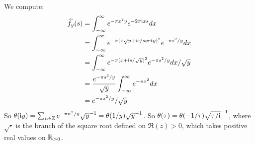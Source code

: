 \documentclass[10pt,a4paper]{article}
\begin{document}
We compute:
\begin{align*}
  \widehat{f_y}(s) &=\int_{-\infty}^{\infty} e^{-\pi x^2 y}e^{-2\pi\mathfrak{i} xs}dx \\
  &= \int_{-\infty}^{\infty} e^{-\pi (x\sqrt{y}+\mathfrak{i} s/sqrt{y})^2}e^{-\pi s^2/y}dx\\
  &= \int_{-\infty}^{\infty} e^{-\pi (x+\mathfrak{i} s/\sqrt{y})^2} e^{-\pi s^2/y}dx/\sqrt{y}\\
  &= \frac{e^{-\pi s^2/y}}{\sqrt{y}}\int_{-\infty}^{\infty} e^{-\pi x^2}dx\\
  &= e^{-\pi s^2/y}/\sqrt{y}
\end{align*}
So $\theta(\mathfrak{i} y) = \sum_{n \in \mathbb{Z}} e^{-\pi n^2/y}\sqrt{y}^{-1} = \theta(1/y)\sqrt{y}^{-1}$. So $\theta(\tau) = \theta(-1/\tau)\sqrt{\tau/\mathfrak{i}}^{-1}$, where $\sqrt{\cdot}$ is the branch of the square root defined on $\Re(z) > 0$, which takes positive real values on $\mathbb{R}_{>0}$.
\end{document}

